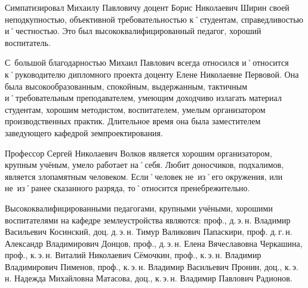 Симпатизировал Михаилу Павловичу доцент Борис Николаевич Ширин своей неподкупностью, объективной требовательностью к˚студентам, справедливостью и˚честностью. Это был высококвалифицированный педагог, хороший воспитатель.

С~большой благодарностью Михаил Павлович всегда относился и˚относится к˚руководителю дипломного проекта доценту Елене Николаевне Первовой. Она была высокообразованным, спокойным, выдержанным, тактичным и˚требовательным преподавателем, умеющим доходчиво излагать материал студентам, хорошим методистом, воспитателем, умелым организатором производственных практик. Длительное время она была заместителем заведующего кафедрой земпроектирования.

Профессор Сергей Николаевич Волков является хорошим организатором, крупным учёным, умело работает на˚себя. Любит доносчиков, подхалимов, является злопамятным человеком. Если˚человек не~из˚его окружения, или не~из˚ранее сказанного разряда, то˚относится пренебрежительно. 

Высококвалифицированными педагогами, крупными учёными, хорошими воспитателями на кафедре землеустройства являются: проф., д.\,э.\,н. Владимир Васильевич Косинский, доц. д.\,э.\,н. Тимур Валикович Папаскири, проф. д.\,г.\,н. Александр Владимирович Донцов, проф., д.\,э.\,н. Елена Вячеславовна Черкашина, проф., к.\,э.\,н. Виталий Николаевич Сёмочкин, проф., к.\,э.\,н. Владимир Владимирович Пименов, проф., к.\,э.\,н. Владимир Васильевич Пронин, доц., к.\,э.\,н. Надежда Михайловна Матасова, доц., к.\,э.\,н. Владимир Павлович Радионов.
